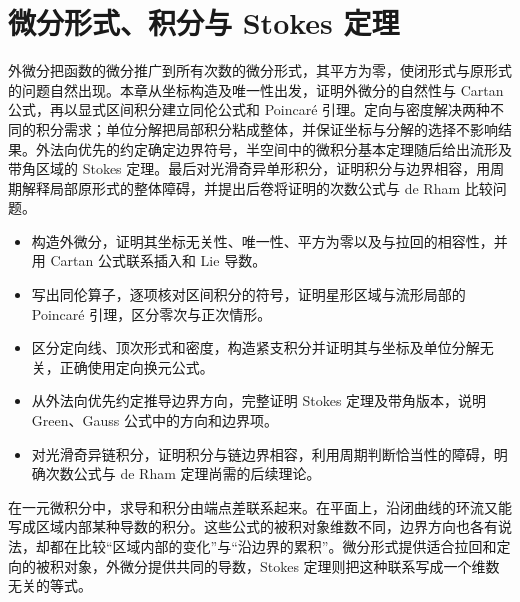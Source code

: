 
% 
% 

\chapter{微分形式、积分与 Stokes 定理}
\label{g1:ch:14}

\begin{chapterabstract}
	外微分把函数的微分推广到所有次数的微分形式，其平方为零，使闭形式与原形式的问题自然出现。本章从坐标构造及唯一性出发，证明外微分的自然性与 Cartan 公式，再以显式区间积分建立同伦公式和 Poincaré 引理。定向与密度解决两种不同的积分需求；单位分解把局部积分粘成整体，并保证坐标与分解的选择不影响结果。外法向优先的约定确定边界符号，半空间中的微积分基本定理随后给出流形及带角区域的 Stokes 定理。最后对光滑奇异单形积分，证明积分与边界相容，用周期解释局部原形式的整体障碍，并提出后卷将证明的次数公式与 de Rham 比较问题。
\end{chapterabstract}

\begin{learninggoals}
	\begin{itemize}
		\item 构造外微分，证明其坐标无关性、唯一性、平方为零以及与拉回的相容性，并用 Cartan 公式联系插入和 Lie 导数。
		\item 写出同伦算子，逐项核对区间积分的符号，证明星形区域与流形局部的 Poincaré 引理，区分零次与正次情形。
		\item 区分定向线、顶次形式和密度，构造紧支积分并证明其与坐标及单位分解无关，正确使用定向换元公式。
		\item 从外法向优先约定推导边界方向，完整证明 Stokes 定理及带角版本，说明 Green、Gauss 公式中的方向和边界项。
		\item 对光滑奇异链积分，证明积分与链边界相容，利用周期判断恰当性的障碍，明确次数公式与 de Rham 定理尚需的后续理论。
	\end{itemize}
\end{learninggoals}

在一元微积分中，求导和积分由端点差联系起来。在平面上，沿闭曲线的环流又能写成区域内部某种导数的积分。这些公式的被积对象维数不同，边界方向也各有说法，却都在比较“区域内部的变化”与“沿边界的累积”。微分形式提供适合拉回和定向的被积对象，外微分提供共同的导数，Stokes 定理则把这种联系写成一个维数无关的等式。

